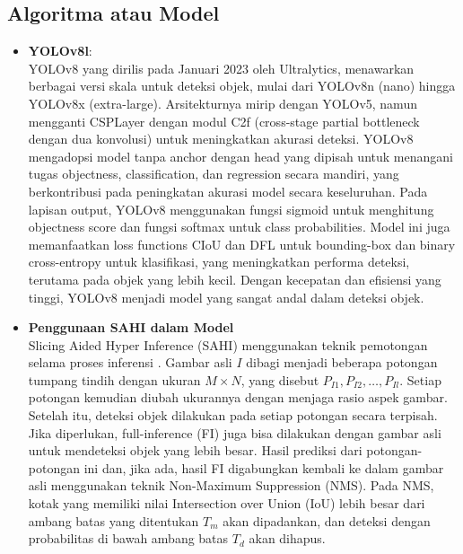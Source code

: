 \documentclass[journal,article,submit,pdftex,moreauthors]{Definitions/mdpi}
\begin{document}
\subsection{Algoritma atau Model}
\begin{itemize}
    \item {\textbf{YOLOv8l}}: \\
   YOLOv8 yang dirilis pada Januari 2023 oleh Ultralytics, menawarkan berbagai versi skala untuk deteksi objek, mulai dari YOLOv8n (nano) hingga YOLOv8x (extra-large). Arsitekturnya mirip dengan YOLOv5, namun mengganti CSPLayer dengan modul C2f (cross-stage partial bottleneck dengan dua konvolusi) untuk meningkatkan akurasi deteksi. YOLOv8 mengadopsi model tanpa anchor dengan head yang dipisah untuk menangani tugas objectness, classification, dan regression secara mandiri, yang berkontribusi pada peningkatan akurasi model secara keseluruhan. Pada lapisan output, YOLOv8 menggunakan fungsi sigmoid untuk menghitung objectness score dan fungsi softmax untuk class probabilities. Model ini juga memanfaatkan loss functions CIoU dan DFL untuk bounding-box dan binary cross-entropy untuk klasifikasi, yang meningkatkan performa deteksi, terutama pada objek yang lebih kecil. Dengan kecepatan dan efisiensi yang tinggi, YOLOv8 menjadi model yang sangat andal dalam deteksi objek. \cite{Terven2023}
    \item {\textbf{Penggunaan SAHI dalam Model}}\\
    Slicing Aided Hyper Inference (SAHI) menggunakan teknik pemotongan selama proses inferensi \cite{AKYON2022}. Gambar asli \( I \) dibagi menjadi beberapa potongan tumpang tindih dengan ukuran \( M \times N \), yang disebut \( P_{I1}, P_{I2}, \dots, P_{Il} \). Setiap potongan kemudian diubah ukurannya dengan menjaga rasio aspek gambar. Setelah itu, deteksi objek dilakukan pada setiap potongan secara terpisah. Jika diperlukan, full-inference (FI) juga bisa dilakukan dengan gambar asli untuk mendeteksi objek yang lebih besar. Hasil prediksi dari potongan-potongan ini dan, jika ada, hasil FI digabungkan kembali ke dalam gambar asli menggunakan teknik Non-Maximum Suppression (NMS). Pada NMS, kotak yang memiliki nilai Intersection over Union (IoU) lebih besar dari ambang batas yang ditentukan \( T_m \) akan dipadankan, dan deteksi dengan probabilitas di bawah ambang batas \( T_d \) akan dihapus.

    
\end{itemize}
\end{document}
